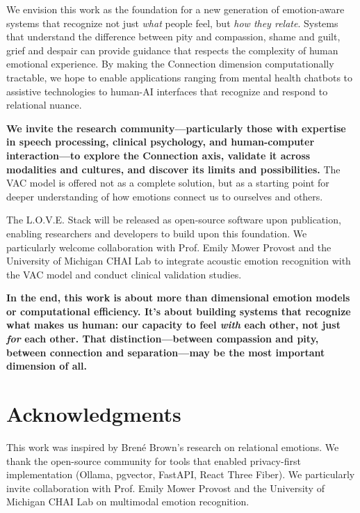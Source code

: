 \documentclass[10pt,twocolumn]{article}
\begin{document}
We envision this work as the foundation for a new generation of emotion-aware systems that recognize not just \textit{what} people feel, but \textit{how they relate}. Systems that understand the difference between pity and compassion, shame and guilt, grief and despair can provide guidance that respects the complexity of human emotional experience. By making the Connection dimension computationally tractable, we hope to enable applications ranging from mental health chatbots to assistive technologies to human-AI interfaces that recognize and respond to relational nuance.

\textbf{We invite the research community—particularly those with expertise in speech processing, clinical psychology, and human-computer interaction—to explore the Connection axis, validate it across modalities and cultures, and discover its limits and possibilities.} The VAC model is offered not as a complete solution, but as a starting point for deeper understanding of how emotions connect us to ourselves and others.

The L.O.V.E. Stack will be released as open-source software upon publication, enabling researchers and developers to build upon this foundation. We particularly welcome collaboration with Prof. Emily Mower Provost and the University of Michigan CHAI Lab to integrate acoustic emotion recognition with the VAC model and conduct clinical validation studies.

\textbf{In the end, this work is about more than dimensional emotion models or computational efficiency. It's about building systems that recognize what makes us human: our capacity to feel \textit{with} each other, not just \textit{for} each other. That distinction—between compassion and pity, between connection and separation—may be the most important dimension of all.}

\section*{Acknowledgments}
This work was inspired by Brené Brown's research on relational emotions. We thank the open-source community for tools that enabled privacy-first implementation (Ollama, pgvector, FastAPI, React Three Fiber). We particularly invite collaboration with Prof. Emily Mower Provost and the University of Michigan CHAI Lab on multimodal emotion recognition.



\end{document}
